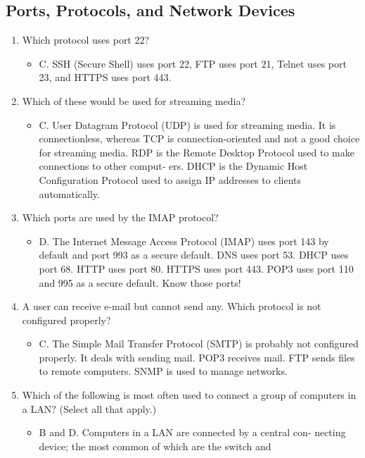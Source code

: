\documentclass{article}
\begin{document}
\subsection{Ports, Protocols, and Network Devices} 
\begin{enumerate}
    \item Which protocol uses port 22?
    \begin{itemize}
        \item  C. SSH (Secure Shell) uses port 22, FTP uses port 21, Telnet
uses port 23, and HTTPS uses port 443.
    \end{itemize}
    \item Which of these would be used for streaming media?
    \begin{itemize}
        \item C. User Datagram Protocol (UDP) is used for streaming media.
It is connectionless, whereas TCP is connection-oriented and
not a good choice for streaming media. RDP is the Remote
Desktop Protocol used to make connections to other comput‐
ers. DHCP is the Dynamic Host Configuration Protocol used
to assign IP addresses to clients automatically.
    \end{itemize}
    \item Which ports are used by the IMAP protocol?
    \begin{itemize}
        \item D. The Internet Message Access Protocol (IMAP) uses port
143 by default and port 993 as a secure default. DNS uses port
53. DHCP uses port 68. HTTP uses port 80. HTTPS uses port
443. POP3 uses port 110 and 995 as a secure default. Know
those ports!
    \end{itemize}
    \item A user can receive e-mail but cannot send any. Which protocol
is not configured properly?
    \begin{itemize}
        \item C. The Simple Mail Transfer Protocol (SMTP) is probably not
configured properly. It deals with sending mail. POP3 receives
mail. FTP sends files to remote computers. SNMP is used to
manage networks.
    \end{itemize}
    \item Which of the following is most often used to connect a group
of computers in a LAN? (Select all that apply.)
    \begin{itemize}
        \item B and D. Computers in a LAN are connected by a central con‐
necting device; the most common of which are the switch and

\end{itemize}
\end{enumerate}
\end{document}
